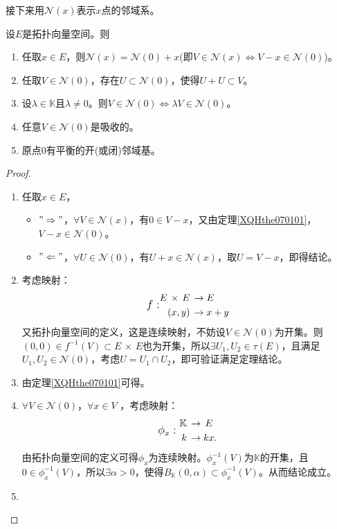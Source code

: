 接下来用$\mathcal{N}(x)$表示$x$点的邻域系。
\begin{theorem}
	设$E$是拓扑向量空间。则
	\begin{enumerate}
		\item 任取$x\in E $，则$\mathcal{N}(x)=\mathcal{N}(0)+x $(即$V\in \mathcal{N}(x)\Leftrightarrow V-x\in \mathcal{N}(0) $)。
		\item 任取$V\in \mathcal{N}(0) $，存在$U\subset \mathcal{N}(0) $，使得$U+U\subset V $。
		\item 设$\lambda\in \mathbb{K} $且$\lambda\neq 0 $。则$V\in \mathcal{N}(0)\Leftrightarrow \lambda V\in \mathcal{N}(0) $。
		\item 任意$V\in \mathcal{N}(0) $是吸收的。
		\item 原点0有平衡的开(或闭)邻域基。
	\end{enumerate}
\end{theorem}
\begin{proof}
	\begin{enumerate}
		\item 任取$x\in E $，
		\begin{itemize}
			\item $"\Rightarrow"$，$\forall V \in \mathcal{N}(x) $，有$0\in V-x $，又由定理\ref{XQHthe070101}，$V-x\in \mathcal{N}(0) $。
			\item $"\Leftarrow"$，$\forall U\in \mathcal{N}(0) $，有$U+x\in \mathcal{N}(x) $，取$U=V-x $，即得结论。
		\end{itemize}
	\item 考虑映射：
	\begin{equation*}
		\text{\large $f:$}
		\begin{aligned}
			E\, \times\, E\,&\rightarrow E\\
			(x,y)\,&\rightarrow x+y
		\end{aligned}
	\end{equation*}
	又拓扑向量空间的定义，这是连续映射，不妨设$V\in \mathcal{N}(0) $为开集。则$(0,0)\in f^{-1}(V) \subset E\, \times \, E $也为开集，所以$\exists U_{1},U_{2} \in \tau(E) $，且满足$U_{1},U_{2}\in \mathcal{N}(0) $，考虑$U= U_{1}\cap U_{2} $，即可验证满足定理结论。
	\item 由定理\ref{XQHthe070101}可得。
	\item $\forall V\in \mathcal{N}(0) $，$\forall x\in V $ ，考虑映射：
	\begin{equation*}
		\text{\large$\phi_{x}:$}\,\,
		\begin{aligned}
			\mathbb{K}\, & \rightarrow \, E\\
			k\, & \rightarrow kx.
		\end{aligned}
	\end{equation*}
	由拓扑向量空间的定义可得$\phi_{x} $为连续映射。$\phi_{x}^{-1}(V)$为$\mathbb{K}$的开集，且$0\in \phi_{x}^{-1}(V) $，所以$\exists \alpha >0 $，使得$B_{\mathbb{K}}(0,\alpha) \subset \phi_{x}^{-1}(V) $。从而结论成立。
	\item 
	\end{enumerate}
\end{proof}



